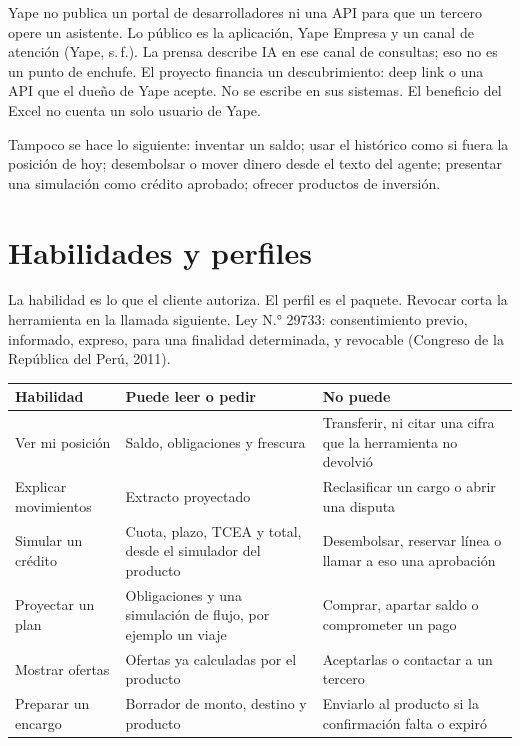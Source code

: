 \documentclass[11pt]{article}
\begin{document}
Yape no publica un portal de desarrolladores ni una API para que un tercero opere un asistente. Lo público es la aplicación, Yape Empresa y un canal de atención (Yape, s.\,f.). La prensa describe IA en ese canal de consultas; eso no es un punto de enchufe. El proyecto financia un descubrimiento: deep link o una API que el dueño de Yape acepte. No se escribe en sus sistemas. El beneficio del Excel no cuenta un solo usuario de Yape.

Tampoco se hace lo siguiente: inventar un saldo; usar el histórico como si fuera la posición de hoy; desembolsar o mover dinero desde el texto del agente; presentar una simulación como crédito aprobado; ofrecer productos de inversión.

\section{Habilidades y perfiles}

La habilidad es lo que el cliente autoriza. El perfil es el paquete. Revocar corta la herramienta en la llamada siguiente. Ley N.° 29733: consentimiento previo, informado, expreso, para una finalidad determinada, y revocable (Congreso de la República del Perú, 2011).

\begin{table}[ht]
\centering
\small
\begin{tabularx}{\textwidth}{@{}l X X@{}}
\toprule
\textbf{Habilidad} & \textbf{Puede leer o pedir} & \textbf{No puede} \\
\midrule
Ver mi posición & Saldo, obligaciones y frescura & Transferir, ni citar una cifra que la herramienta no devolvió \\
Explicar movimientos & Extracto proyectado & Reclasificar un cargo o abrir una disputa \\
Simular un crédito & Cuota, plazo, TCEA y total, desde el simulador del producto & Desembolsar, reservar línea o llamar a eso una aprobación \\
Proyectar un plan & Obligaciones y una simulación de flujo, por ejemplo un viaje & Comprar, apartar saldo o comprometer un pago \\
Mostrar ofertas & Ofertas ya calculadas por el producto & Aceptarlas o contactar a un tercero \\
Preparar un encargo & Borrador de monto, destino y producto & Enviarlo al producto si la confirmación falta o expiró \\
\bottomrule
\end{tabularx}
\end{table}
\end{document}
